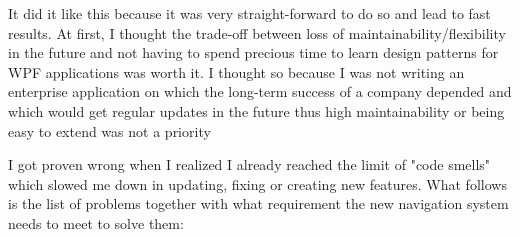 \par

It did it like this because it was very straight-forward to do so and lead to fast results. At first, I thought the trade-off between loss of maintainability/flexibility in the future and not having to spend precious time to learn design patterns for WPF applications was worth it. I thought so because I was not writing an enterprise application on which the long-term success of a company depended and which would get regular updates in the future thus high maintainability or being easy to extend was not a priority

\par

I got proven wrong when I realized I already reached the limit of "code smells" which slowed me down in updating, fixing or creating new features. What follows is the list of problems together with what requirement the new navigation system needs to meet to solve them:

